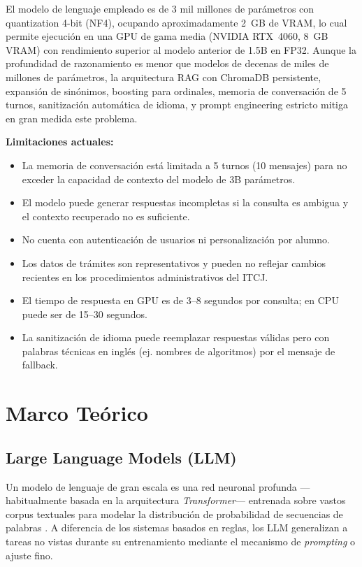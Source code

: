 El modelo de lenguaje empleado es de 3 mil millones de parámetros con quantization 4-bit (NF4), ocupando aproximadamente 2~GB de VRAM, lo cual permite ejecución en una GPU de gama media (NVIDIA RTX~4060, 8~GB VRAM) con rendimiento superior al modelo anterior de 1.5B en FP32. Aunque la profundidad de razonamiento es menor que modelos de decenas de miles de millones de parámetros, la arquitectura RAG con ChromaDB persistente, expansión de sinónimos, boosting para ordinales, memoria de conversación de 5 turnos, sanitización automática de idioma, y prompt engineering estricto mitiga en gran medida este problema.

\textbf{Limitaciones actuales:}
\begin{itemize}
    \item La memoria de conversación está limitada a 5 turnos (10 mensajes) para no exceder la capacidad de contexto del modelo de 3B parámetros.
    \item El modelo puede generar respuestas incompletas si la consulta es ambigua y el contexto recuperado no es suficiente.
    \item No cuenta con autenticación de usuarios ni personalización por alumno.
    \item Los datos de trámites son representativos y pueden no reflejar cambios recientes en los procedimientos administrativos del ITCJ.
    \item El tiempo de respuesta en GPU es de 3--8 segundos por consulta; en CPU puede ser de 15--30 segundos.
    \item La sanitización de idioma puede reemplazar respuestas válidas pero con palabras técnicas en inglés (ej. nombres de algoritmos) por el mensaje de fallback.
\end{itemize}


\section{Marco Teórico}
\label{sec:marco}

\subsection{Large Language Models (LLM)}

Un modelo de lenguaje de gran escala es una red neuronal profunda ---habitualmente basada en la arquitectura \textit{Transformer}--- entrenada sobre vastos corpus textuales para modelar la distribución de probabilidad de secuencias de palabras \cite{vaswani_attention_2017, brown_language_2020}. A diferencia de los sistemas basados en reglas, los LLM generalizan a tareas no vistas durante su entrenamiento mediante el mecanismo de \textit{prompting} o ajuste fino.

